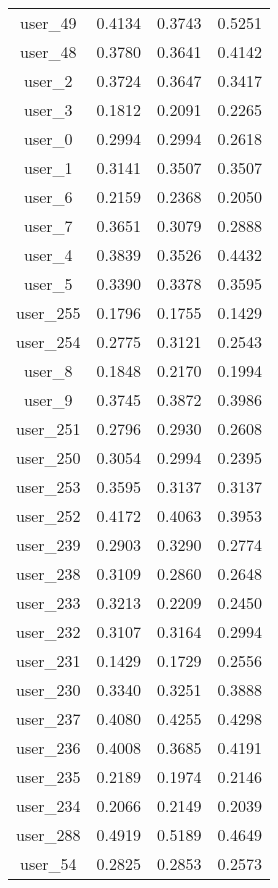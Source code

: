 \begin{table}[ht]
\begin{tabular}{|c|c|c|c|}
user_49  &  0.4134   &  0.3743   &  0.5251 \\ 
user_48  &  0.3780   &  0.3641   &  0.4142 \\ 
user_2  &  0.3724   &  0.3647   &  0.3417 \\ 
user_3  &  0.1812   &  0.2091   &  0.2265 \\ 
user_0  &  0.2994   &  0.2994   &  0.2618 \\ 
user_1  &  0.3141   &  0.3507   &  0.3507 \\ 
user_6  &  0.2159   &  0.2368   &  0.2050 \\ 
user_7  &  0.3651   &  0.3079   &  0.2888 \\ 
user_4  &  0.3839   &  0.3526   &  0.4432 \\ 
user_5  &  0.3390   &  0.3378   &  0.3595 \\ 
user_255  &  0.1796   &  0.1755   &  0.1429 \\ 
user_254  &  0.2775   &  0.3121   &  0.2543 \\ 
user_8  &  0.1848   &  0.2170   &  0.1994 \\ 
user_9  &  0.3745   &  0.3872   &  0.3986 \\ 
user_251  &  0.2796   &  0.2930   &  0.2608 \\ 
user_250  &  0.3054   &  0.2994   &  0.2395 \\ 
user_253  &  0.3595   &  0.3137   &  0.3137 \\ 
user_252  &  0.4172   &  0.4063   &  0.3953 \\ 
user_239  &  0.2903   &  0.3290   &  0.2774 \\ 
user_238  &  0.3109   &  0.2860   &  0.2648 \\ 
user_233  &  0.3213   &  0.2209   &  0.2450 \\ 
user_232  &  0.3107   &  0.3164   &  0.2994 \\ 
user_231  &  0.1429   &  0.1729   &  0.2556 \\ 
user_230  &  0.3340   &  0.3251   &  0.3888 \\ 
user_237  &  0.4080   &  0.4255   &  0.4298 \\ 
user_236  &  0.4008   &  0.3685   &  0.4191 \\ 
user_235  &  0.2189   &  0.1974   &  0.2146 \\ 
user_234  &  0.2066   &  0.2149   &  0.2039 \\ 
user_288  &  0.4919   &  0.5189   &  0.4649 \\ 
user_54  &  0.2825   &  0.2853   &  0.2573 \\ 

\end{tabular}
\end{table}
